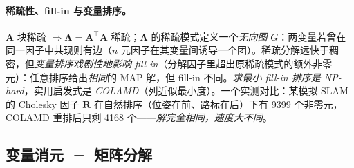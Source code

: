 \paragraph{稀疏性、fill-in 与变量排序。}
$\mathbf{A}$ 块稀疏 $\Rightarrow\boldsymbol{\Lambda}=\mathbf{A}^\top\mathbf{A}$ 稀疏；$\boldsymbol{\Lambda}$ 的稀疏模式定义一个\emph{无向图} $G$：两变量若曾在同一因子中共现则有边（$n$ 元因子在其变量间诱导一个团）。稀疏分解远快于稠密，但\emph{变量排序戏剧性地影响 fill-in}（分解因子里超出原稀疏模式的额外非零元）：任意排序给出\emph{相同}的 MAP 解，但 fill-in 不同。\emph{求最小 fill-in 排序是 NP-hard}，实用启发式是 \emph{COLAMD}（列近似最小度）\cite{carlone2026handbook}。一个实测对比：某模拟 SLAM 的 Cholesky 因子 $\mathbf{R}$ 在自然排序（位姿在前、路标在后）下有 9399 个非零元，COLAMD 重排后只剩 4168 个——\emph{解完全相同，速度大不同}。

\subsection{变量消元 $=$ 矩阵分解}
\label{sec:est-elimination}


